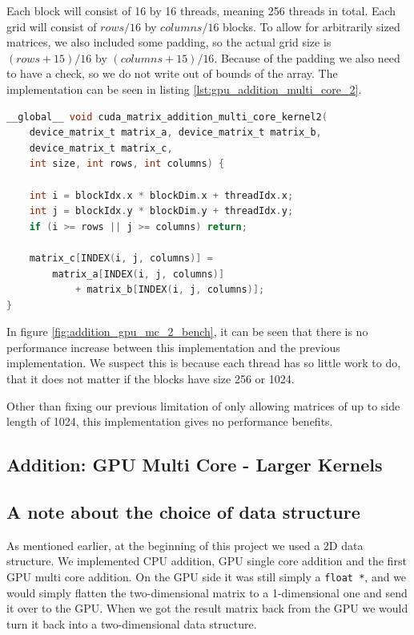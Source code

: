 Each block will consist of 16 by 16 threads, meaning 256 threads in total. Each grid will consist of $rows / 16$ by $columns / 16$ blocks. To allow for arbitrarily sized matrices, we also included some padding, so the actual grid size is $(rows + 15) / 16$ by $(columns + 15) / 16$. Because of the padding we also need to have a check, so we do not write out of bounds of the array. The implementation can be seen in listing \ref{lst:gpu_addition_multi_core_2}.

\begin{lstlisting}[language=C, caption={GPU addition multi core 2}, label={lst:gpu_addition_multi_core_2}]
__global__ void cuda_matrix_addition_multi_core_kernel2(
    device_matrix_t matrix_a, device_matrix_t matrix_b,
    device_matrix_t matrix_c, 
    int size, int rows, int columns) {
    
    int i = blockIdx.x * blockDim.x + threadIdx.x;
    int j = blockIdx.y * blockDim.y + threadIdx.y;
    if (i >= rows || j >= columns) return;

    matrix_c[INDEX(i, j, columns)] =
        matrix_a[INDEX(i, j, columns)] 
            + matrix_b[INDEX(i, j, columns)];
}
\end{lstlisting}

In figure \ref{fig:addition_gpu_mc_2_bench}, it can be seen that there is no performance increase between this implementation and the previous implementation. We suspect this is because each thread has so little work to do, that it does not matter if the blocks have size 256 or 1024. 

Other than fixing our previous limitation of only allowing matrices of up to side length of 1024, this implementation gives no performance benefits.

\subsection{Addition: GPU Multi Core - Larger Kernels}

\subsection{A note about the choice of data structure}

As mentioned earlier, at the beginning of this project we used a 2D data structure. We implemented CPU addition, GPU single core addition and the first GPU multi core addition. On the GPU side it was still simply a \texttt{float *}, and we would simply flatten the two-dimensional matrix to a 1-dimensional one and send it over to the GPU. When we got the result matrix back from the GPU we would turn it back into a two-dimensional data structure. 

